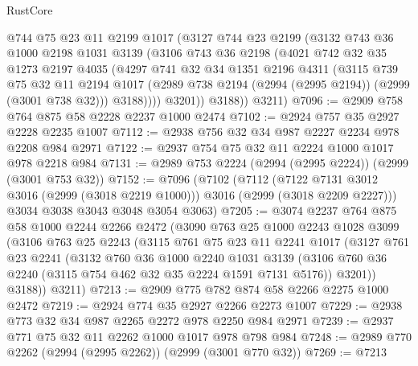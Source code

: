\begin{lexlean}{RustCore}
\begin{coremodule}
          @744
          @75
          @23
          @11
          @2199
          @1017
          (@3127
            @744
            @23
            @2199
            (@3132
              @743
              @36
              @1000
              @2198
              @1031
              @3139
              (@3106
                @743
                @36
                @2198
                (@4021
                  @742
                  @32
                  @35
                  @1273
                  @2197
                  @4035
                  (@4297
                    @741
                    @32
                    @34
                    @1351
                    @2196
                    @4311
                    (@3115
                      @739
                      @75
                      @32
                      @11
                      @2194
                      @1017
                      (@2989 @738 @2194 (@2994 (@2995 @2194)) (@2999 (@3001 @738 @32)))
                      @3188))))
              @3201))
          @3188))
      @3211)
@7096 := @2909 @758 @764 @875 @58 @2228 @2237 @1000 @2474
@7102 := @2924 @757 @35 @2927 @2228 @2235 @1007
@7112 := @2938 @756 @32 @34 @987 @2227 @2234 @978 @2208 @984 @2971
@7122 := @2937 @754 @75 @32 @11 @2224 @1000 @1017 @978 @2218 @984
@7131 := @2989 @753 @2224 (@2994 (@2995 @2224)) (@2999 (@3001 @753 @32))
@7152 := @7096
    (@7102
      (@7112
        (@7122 @7131 @3012 @3016 (@2999 (@3018 @2219 @1000)))
        @3016
        (@2999 (@3018 @2209 @2227)))
      @3034
      @3038
      @3043
      @3048
      @3054
      @3063)
@7205 := @3074
    @2237
    @764
    @875
    @58
    @1000
    @2244
    @2266
    @2472
    (@3090
      @763
      @25
      @1000
      @2243
      @1028
      @3099
      (@3106
        @763
        @25
        @2243
        (@3115
          @761
          @75
          @23
          @11
          @2241
          @1017
          (@3127
            @761
            @23
            @2241
            (@3132
              @760
              @36
              @1000
              @2240
              @1031
              @3139
              (@3106 @760 @36 @2240 (@3115 @754 @462 @32 @35 @2224 @1591 @7131 @5176))
              @3201))
          @3188))
      @3211)
@7213 := @2909 @775 @782 @874 @58 @2266 @2275 @1000 @2472
@7219 := @2924 @774 @35 @2927 @2266 @2273 @1007
@7229 := @2938 @773 @32 @34 @987 @2265 @2272 @978 @2250 @984 @2971
@7239 := @2937 @771 @75 @32 @11 @2262 @1000 @1017 @978 @798 @984
@7248 := @2989 @770 @2262 (@2994 (@2995 @2262)) (@2999 (@3001 @770 @32))
@7269 := @7213

\end{coremodule}
\end{lexlean}

